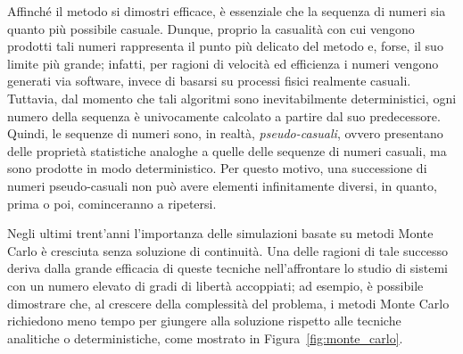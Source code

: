 Affinché il metodo si dimostri efficace, è essenziale che la sequenza di numeri sia quanto più possibile casuale.
Dunque, proprio la casualità con cui vengono prodotti tali numeri rappresenta il punto più delicato del metodo e, forse, il suo limite più grande; infatti, per ragioni di velocità ed efficienza i numeri vengono generati via software, invece di basarsi su processi fisici realmente casuali.
Tuttavia, dal momento che tali algoritmi sono inevitabilmente deterministici, ogni numero della sequenza è univocamente calcolato a partire dal suo predecessore. 
Quindi, le sequenze di numeri sono, in realtà, \emph{pseudo-casuali}, ovvero presentano delle proprietà statistiche analoghe a quelle delle sequenze di numeri casuali, ma sono prodotte in modo deterministico. 
Per questo motivo, una successione di numeri pseudo-casuali non può avere elementi infinitamente diversi, in quanto, prima o poi, cominceranno a ripetersi.

Negli ultimi trent'anni l'importanza delle simulazioni basate su metodi Monte Carlo è cresciuta senza soluzione di continuità. 
Una delle ragioni di tale successo deriva dalla grande efficacia di queste tecniche nell'affrontare lo studio di sistemi con un numero elevato di gradi di libertà accoppiati; 
ad esempio, è possibile dimostrare che, al crescere della complessità del problema, i metodi Monte Carlo richiedono meno tempo per giungere alla soluzione rispetto alle tecniche analitiche o deterministiche, come mostrato in Figura~\ref{fig:monte_carlo}.



